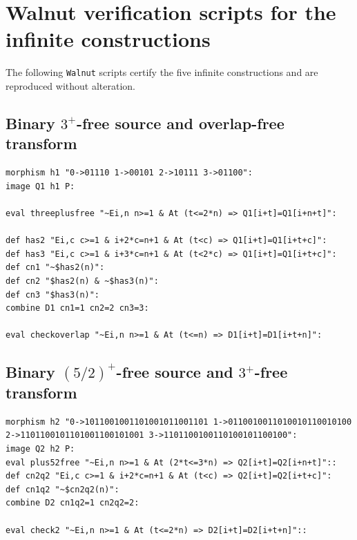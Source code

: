 \documentclass[12pt,reqno]{article}
\begin{document}
\appendix
\section{Walnut verification scripts for the infinite constructions}
\label{app:walnut}

The following {\tt Walnut} scripts certify the five infinite constructions and are reproduced without alteration.

\subsection{\texorpdfstring{Binary $3^+$-free source and overlap-free transform}{Binary 3+-free source and overlap-free transform}}
\label{app:h1}
\begin{verbatim} 
morphism h1 "0->01110 1->00101 2->10111 3->01100": 
image Q1 h1 P:

eval threeplusfree "~Ei,n n>=1 & At (t<=2*n) => Q1[i+t]=Q1[i+n+t]":

def has2 "Ei,c c>=1 & i+2*c=n+1 & At (t<c) => Q1[i+t]=Q1[i+t+c]":
def has3 "Ei,c c>=1 & i+3*c=n+1 & At (t<2*c) => Q1[i+t]=Q1[i+t+c]":
def cn1 "~$has2(n)":
def cn2 "$has2(n) & ~$has3(n)":
def cn3 "$has3(n)":
combine D1 cn1=1 cn2=2 cn3=3:

eval checkoverlap "~Ei,n n>=1 & At (t<=n) => D1[i+t]=D1[i+t+n]": 
\end{verbatim}

\subsection{\texorpdfstring{Binary $(5/2)^+$-free source and $3^+$-free transform}{Binary (5/2)+-free source and 3+-free transform}}
\label{app:h2}
\begin{verbatim} 
morphism h2 "0->1011001001101001011001101 1->0110010011010010110010100 
2->1101100101101001100101001 3->1101100100110100101100100": 
image Q2 h2 P: 
eval plus52free "~Ei,n n>=1 & At (2*t<=3*n) => Q2[i+t]=Q2[i+n+t]"::
def cn2q2 "Ei,c c>=1 & i+2*c=n+1 & At (t<c) => Q2[i+t]=Q2[i+t+c]":
def cn1q2 "~$cn2q2(n)":
combine D2 cn1q2=1 cn2q2=2:

eval check2 "~Ei,n n>=1 & At (t<=2*n) => D2[i+t]=D2[i+t+n]":: 
\end{verbatim}
\end{document}
